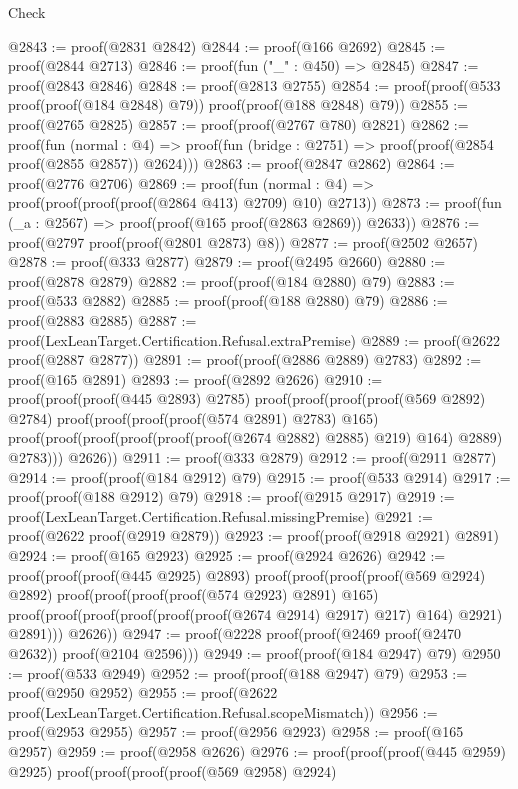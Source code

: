 \begin{lexlean}{Check}
\begin{coremodule}
@2843 := proof(@2831 @2842)
@2844 := proof(@166 @2692)
@2845 := proof(@2844 @2713)
@2846 := proof(fun ("_" : @450) => @2845)
@2847 := proof(@2843 @2846)
@2848 := proof(@2813 @2755)
@2854 := proof(proof(@533 proof(proof(@184 @2848) @79)) proof(proof(@188 @2848) @79))
@2855 := proof(@2765 @2825)
@2857 := proof(proof(@2767 @780) @2821)
@2862 := proof(fun (normal : @4) =>
    proof(fun (bridge : @2751) => proof(proof(@2854 proof(@2855 @2857)) @2624)))
@2863 := proof(@2847 @2862)
@2864 := proof(@2776 @2706)
@2869 := proof(fun (normal : @4) => proof(proof(proof(proof(@2864 @413) @2709) @10) @2713))
@2873 := proof(fun (_a : @2567) => proof(proof(@165 proof(@2863 @2869)) @2633))
@2876 := proof(@2797 proof(proof(@2801 @2873) @8))
@2877 := proof(@2502 @2657)
@2878 := proof(@333 @2877)
@2879 := proof(@2495 @2660)
@2880 := proof(@2878 @2879)
@2882 := proof(proof(@184 @2880) @79)
@2883 := proof(@533 @2882)
@2885 := proof(proof(@188 @2880) @79)
@2886 := proof(@2883 @2885)
@2887 := proof(LexLeanTarget.Certification.Refusal.extraPremise)
@2889 := proof(@2622 proof(@2887 @2877))
@2891 := proof(proof(@2886 @2889) @2783)
@2892 := proof(@165 @2891)
@2893 := proof(@2892 @2626)
@2910 := proof(proof(proof(@445 @2893) @2785)
      proof(proof(proof(proof(@569 @2892) @2784)
            proof(proof(proof(proof(@574 @2891) @2783) @165)
                proof(proof(proof(proof(proof(proof(@2674 @2882) @2885) @219) @164) @2889) @2783)))
          @2626))
@2911 := proof(@333 @2879)
@2912 := proof(@2911 @2877)
@2914 := proof(proof(@184 @2912) @79)
@2915 := proof(@533 @2914)
@2917 := proof(proof(@188 @2912) @79)
@2918 := proof(@2915 @2917)
@2919 := proof(LexLeanTarget.Certification.Refusal.missingPremise)
@2921 := proof(@2622 proof(@2919 @2879))
@2923 := proof(proof(@2918 @2921) @2891)
@2924 := proof(@165 @2923)
@2925 := proof(@2924 @2626)
@2942 := proof(proof(proof(@445 @2925) @2893)
      proof(proof(proof(proof(@569 @2924) @2892)
            proof(proof(proof(proof(@574 @2923) @2891) @165)
                proof(proof(proof(proof(proof(proof(@2674 @2914) @2917) @217) @164) @2921) @2891)))
          @2626))
@2947 := proof(@2228 proof(proof(@2469 proof(@2470 @2632)) proof(@2104 @2596)))
@2949 := proof(proof(@184 @2947) @79)
@2950 := proof(@533 @2949)
@2952 := proof(proof(@188 @2947) @79)
@2953 := proof(@2950 @2952)
@2955 := proof(@2622 proof(LexLeanTarget.Certification.Refusal.scopeMismatch))
@2956 := proof(@2953 @2955)
@2957 := proof(@2956 @2923)
@2958 := proof(@165 @2957)
@2959 := proof(@2958 @2626)
@2976 := proof(proof(proof(@445 @2959) @2925)
      proof(proof(proof(proof(@569 @2958) @2924)

\end{coremodule}
\end{lexlean}
